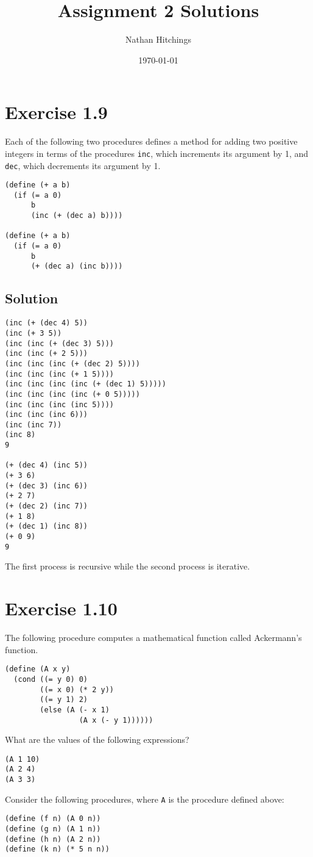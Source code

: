 \documentclass[11pt]{article}
\author{Nathan Hitchings}
\date{\today}
\title{Assignment 2 Solutions}
\begin{document}
\maketitle
\section{Exercise 1.9}
\label{sec:org37831e6}
Each of the following two procedures defines a method for adding two positive
integers in terms of the procedures \texttt{inc}, which increments its argument by 1,
and \texttt{dec}, which decrements its argument by 1.
\begin{verbatim}
(define (+ a b)
  (if (= a 0)
      b
      (inc (+ (dec a) b))))

(define (+ a b)
  (if (= a 0)
      b
      (+ (dec a) (inc b))))
\end{verbatim}
\subsection{Solution}
\label{sec:orgfd8ab2a}
\begin{verbatim}
(inc (+ (dec 4) 5))
(inc (+ 3 5))
(inc (inc (+ (dec 3) 5)))
(inc (inc (+ 2 5)))
(inc (inc (inc (+ (dec 2) 5))))
(inc (inc (inc (+ 1 5))))
(inc (inc (inc (inc (+ (dec 1) 5)))))
(inc (inc (inc (inc (+ 0 5)))))
(inc (inc (inc (inc 5))))
(inc (inc (inc 6)))
(inc (inc 7))
(inc 8)
9

(+ (dec 4) (inc 5))
(+ 3 6)
(+ (dec 3) (inc 6))
(+ 2 7)
(+ (dec 2) (inc 7))
(+ 1 8)
(+ (dec 1) (inc 8))
(+ 0 9)
9
\end{verbatim}
The first process is recursive while the second process is iterative.

\section{Exercise 1.10}
\label{sec:org9ff7ee2}
The following procedure computes a mathematical function called Ackermann's
function.
\begin{verbatim}
(define (A x y)
  (cond ((= y 0) 0)
        ((= x 0) (* 2 y))
        ((= y 1) 2)
        (else (A (- x 1)
                 (A x (- y 1))))))
\end{verbatim}

What are the values of the following expressions?
\begin{verbatim}
(A 1 10)
(A 2 4)
(A 3 3)
\end{verbatim}

Consider the following procedures, where \texttt{A} is the procedure defined above:
\begin{verbatim}
(define (f n) (A 0 n))
(define (g n) (A 1 n))
(define (h n) (A 2 n))
(define (k n) (* 5 n n))
\end{verbatim}
\end{document}

